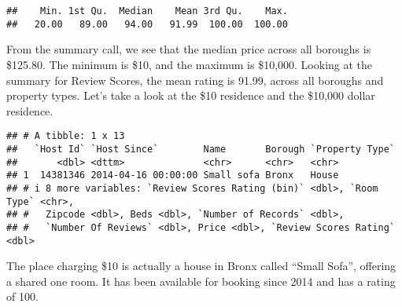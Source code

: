 \documentclass[
]{article}
\newenvironment{Shaded}{\begin{snugshade}}{\end{snugshade}}
\newcommand{\AttributeTok}[1]{\textcolor[rgb]{0.77,0.63,0.00}{#1}}
\newcommand{\CommentTok}[1]{\textcolor[rgb]{0.56,0.35,0.01}{\textit{#1}}}
\newcommand{\FunctionTok}[1]{\textcolor[rgb]{0.00,0.00,0.00}{#1}}
\newcommand{\NormalTok}[1]{#1}
\newcommand{\SpecialCharTok}[1]{\textcolor[rgb]{0.00,0.00,0.00}{#1}}
\newcommand{\StringTok}[1]{\textcolor[rgb]{0.31,0.60,0.02}{#1}}
\begin{document}
\begin{Shaded}
\end{Shaded}

\begin{verbatim}
##    Min. 1st Qu.  Median    Mean 3rd Qu.    Max. 
##   20.00   89.00   94.00   91.99  100.00  100.00
\end{verbatim}

From the summary call, we see that the median price across all boroughs
is \$125.80. The minimum is \$10, and the maximum is \$10,000. Looking
at the summary for Review Scores, the mean rating is 91.99, across all
boroughs and property types. Let's take a look at the \$10 residence and
the \$10,000 dollar residence.

\begin{Shaded}
\end{Shaded}

\begin{verbatim}
## # A tibble: 1 x 13
##   `Host Id` `Host Since`        Name       Borough `Property Type`
##       <dbl> <dttm>              <chr>      <chr>   <chr>          
## 1  14381346 2014-04-16 00:00:00 Small sofa Bronx   House          
## # i 8 more variables: `Review Scores Rating (bin)` <dbl>, `Room Type` <chr>,
## #   Zipcode <dbl>, Beds <dbl>, `Number of Records` <dbl>,
## #   `Number Of Reviews` <dbl>, Price <dbl>, `Review Scores Rating` <dbl>
\end{verbatim}

The place charging \$10 is actually a house in Bronx called ``Small
Sofa'', offering a shared one room. It has been available for booking
since 2014 and has a rating of 100.

\begin{Shaded}
\end{Shaded}
\end{document}
